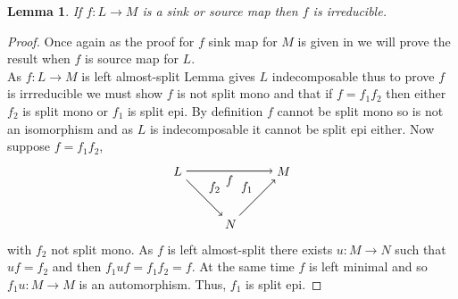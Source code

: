 \documentclass[11.5pt, twoside, a4paper, titlepage]{report}
\theoremstyle{definition}
\theoremstyle{plain}
\newtheorem{lem}[mydef]{Lemma}
\begin{document}
\begin{lem} \label{lrirrlem}
If $f: L\to M$ is a sink or source map then $f$ is irreducible.
\end{lem}
\begin{proof}
Once again as the proof for $f$ sink map for $M$ is given in \cite{Vale} we will prove the result when $f$ is source map for $L$.\\
As $f: L \to M$ is left almost-split Lemma \label{indeclem} gives $L$ indecomposable thus to prove $f$ is irrreducible we must show $f$ is not split mono and that if $f=f_1f_2$ then either $f_2$ is split mono or $f_1$ is split epi. By definition $f$ cannot be split mono so is not an isomorphism and as $L$ is indecomposable it cannot be split epi either. Now suppose $f=f_1f_2$,
\begin{equation*}
\begin{tikzpicture}[->,-latex, auto, main path/.style={->, semithick}, main node/.style={}]
\node	[main node]		(1) at (0,0)		{$L$};
\node [main node]		(2) at (3, 0)		{$M$};
\node [main node]		(3) at (1.5,-1.5)	{$N$};

\draw (1) [main path] edge node [auto, swap] {$f$} (2);
\draw (1) [main path] edge node [auto] {$f_2$} (3);
\draw (3) [main path] edge node [auto] {$f_1$} (2);
\end{tikzpicture}
\end{equation*}
with $f_2$ not split mono. As $f$ is left almost-split there exists $u: M \to N$ such that $uf=f_2$ and then $f_1uf=f_1f_2=f$. At the same time $f$ is left minimal and so $f_1u: M \to M$ is an automorphism. Thus, $f_1$ is split epi.
\end{proof}
\end{document}
